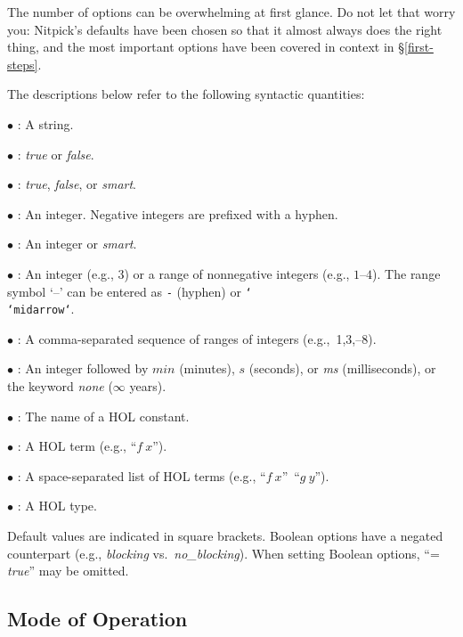 \documentclass[a4paper,12pt]{article}
\begin{document}
The number of options can be overwhelming at first glance. Do not let that worry
you: Nitpick's defaults have been chosen so that it almost always does the right
thing, and the most important options have been covered in context in
\S\ref{first-steps}.

The descriptions below refer to the following syntactic quantities:

\begin{enum}
\item[$\bullet$] : A string.
\item[$\bullet$] : \textit{true} or \textit{false}.
\item[$\bullet$] : \textit{true}, \textit{false}, or \textit{smart}.
\item[$\bullet$] : An integer. Negative integers are prefixed with a hyphen.
\item[$\bullet$] : An integer or \textit{smart}.
\item[$\bullet$] : An integer (e.g., 3) or a range
of nonnegative integers (e.g., $1$--$4$). The range symbol `--' can be entered as \texttt{-} (hyphen) or \texttt{\char`\\\char`\<midarrow\char`\>}.

\item[$\bullet$] : A comma-separated sequence of ranges of integers (e.g.,~1{,}3{,}--8).
\item[$\bullet$] : An integer followed by $\textit{min}$ (minutes), $s$ (seconds), or \textit{ms}
(milliseconds), or the keyword \textit{none} ($\infty$ years).
\item[$\bullet$] : The name of a HOL constant.
\item[$\bullet$] : A HOL term (e.g., ``$f~x$'').
\item[$\bullet$] : A space-separated list of HOL terms (e.g.,
``$f~x$''~``$g~y$'').
\item[$\bullet$] : A HOL type.
\end{enum}

Default values are indicated in square brackets. Boolean options have a negated
counterpart (e.g., \textit{blocking} vs.\ \textit{no\_blocking}). When setting
Boolean options, ``= \textit{true}'' may be omitted.

\subsection{Mode of Operation}
\label{mode-of-operation}
\end{document}
